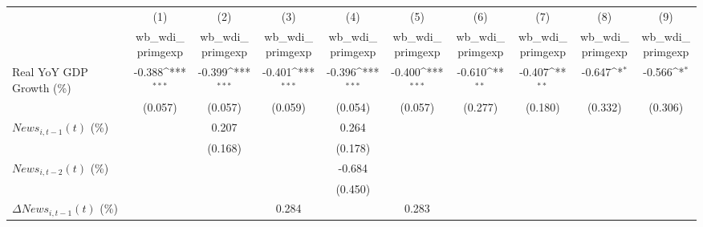 {
\def\sym#1{\ifmmode^{#1}\else\(^{#1}\)\fi}
\begin{tabular}{l*{9}{c}}
\toprule
                    &\multicolumn{1}{c}{(1)}&\multicolumn{1}{c}{(2)}&\multicolumn{1}{c}{(3)}&\multicolumn{1}{c}{(4)}&\multicolumn{1}{c}{(5)}&\multicolumn{1}{c}{(6)}&\multicolumn{1}{c}{(7)}&\multicolumn{1}{c}{(8)}&\multicolumn{1}{c}{(9)}\\
                    &\multicolumn{1}{c}{wb_wdi_primgexp}&\multicolumn{1}{c}{wb_wdi_primgexp}&\multicolumn{1}{c}{wb_wdi_primgexp}&\multicolumn{1}{c}{wb_wdi_primgexp}&\multicolumn{1}{c}{wb_wdi_primgexp}&\multicolumn{1}{c}{wb_wdi_primgexp}&\multicolumn{1}{c}{wb_wdi_primgexp}&\multicolumn{1}{c}{wb_wdi_primgexp}&\multicolumn{1}{c}{wb_wdi_primgexp}\\
\midrule
Real YoY GDP Growth (\%)&      -0.388\sym{***}&      -0.399\sym{***}&      -0.401\sym{***}&      -0.396\sym{***}&      -0.400\sym{***}&      -0.610\sym{**} &      -0.407\sym{**} &      -0.647\sym{*}  &      -0.566\sym{*}  \\
                    &     (0.057)         &     (0.057)         &     (0.059)         &     (0.054)         &     (0.057)         &     (0.277)         &     (0.180)         &     (0.332)         &     (0.306)         \\
\addlinespace
$ News_{i,t-1}(t)$ (\%)&                     &       0.207         &                     &       0.264         &                     &                     &                     &                     &                     \\
                    &                     &     (0.168)         &                     &     (0.178)         &                     &                     &                     &                     &                     \\
\addlinespace
$ News_{i,t-2}(t)$ (\%)&                     &                     &                     &      -0.684         &                     &                     &                     &                     &                     \\
                    &                     &                     &                     &     (0.450)         &                     &                     &                     &                     &                     \\
\addlinespace
$ \Delta News_{i,t-1}(t)$ (\%)&                     &                     &       0.284         &                     &       0.283         &                     &                     &                     &                     \\

\end{tabular}}

